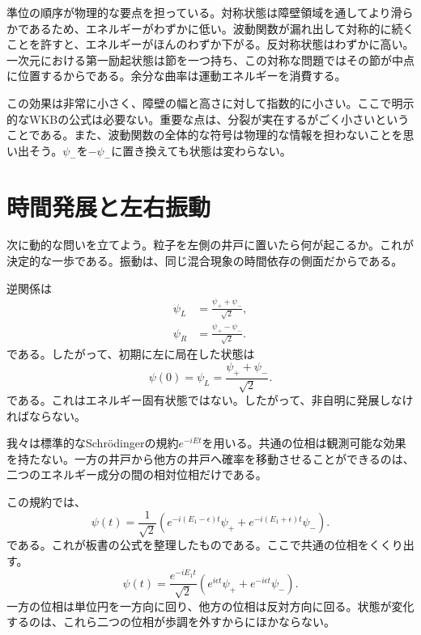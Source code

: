 準位の順序が物理的な要点を担っている。対称状態は障壁領域を通してより滑らかであるため、エネルギーがわずかに低い。波動関数が漏れ出して対称的に続くことを許すと、エネルギーがほんのわずか下がる。反対称状態はわずかに高い。一次元における第一励起状態は節を一つ持ち、この対称な問題ではその節が中点に位置するからである。余分な曲率は運動エネルギーを消費する。

この効果は非常に小さく、障壁の幅と高さに対して指数的に小さい。ここで明示的なWKBの公式は必要ない。重要な点は、分裂が実在するがごく小さいということである。また、波動関数の全体的な符号は物理的な情報を担わないことを思い出そう。\(\psi_-\)を\(-\psi_-\)に置き換えても状態は変わらない。

\section{時間発展と左右振動}

次に動的な問いを立てよう。粒子を左側の井戸に置いたら何が起こるか。これが決定的な一歩である。振動は、同じ混合現象の時間依存の側面だからである。

逆関係は
\begin{align}
\psi_L &= \frac{\psi_+ + \psi_-}{\sqrt{2}},\\
\psi_R &= \frac{\psi_+ - \psi_-}{\sqrt{2}}.
\end{align}
である。したがって、初期に左に局在した状態は
\begin{equation}
\psi(0)=\psi_L=\frac{\psi_+ + \psi_-}{\sqrt{2}}.
\end{equation}
である。これはエネルギー固有状態ではない。したがって、非自明に発展しなければならない。

我々は標準的なSchr\"odingerの規約\(e^{-iEt}\)を用いる。共通の位相は観測可能な効果を持たない。一方の井戸から他方の井戸へ確率を移動させることができるのは、二つのエネルギー成分の間の相対位相だけである。

この規約では、
\begin{equation}
\psi(t)=\frac{1}{\sqrt{2}}\left(e^{-i(E_1-\epsilon)t}\psi_+ + e^{-i(E_1+\epsilon)t}\psi_-\right).
\end{equation}
である。これが板書の公式を整理したものである。ここで共通の位相をくくり出す。
\begin{equation}
\psi(t)=\frac{e^{-iE_1 t}}{\sqrt{2}}\left(e^{i\epsilon t}\psi_+ + e^{-i\epsilon t}\psi_-\right).
\end{equation}
一方の位相は単位円を一方向に回り、他方の位相は反対方向に回る。状態が変化するのは、これら二つの位相が歩調を外すからにほかならない。

